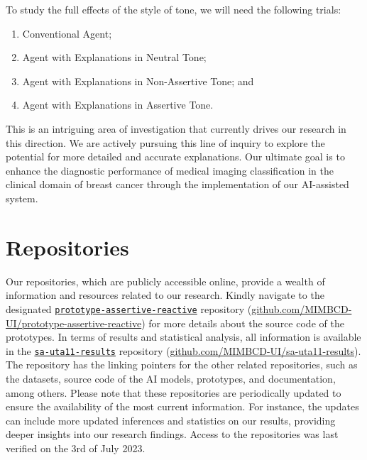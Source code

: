 \vspace{2.00mm}

\noindent
To study the full effects of the style of tone, we will need the following trials:

\vspace{0.05mm}

\begin{enumerate}
\item Conventional Agent;
\item Agent with Explanations in Neutral Tone;
\item Agent with Explanations in Non-Assertive Tone; and
\item Agent with Explanations in Assertive Tone.
\end{enumerate}

\vspace{0.50mm}

This is an intriguing area of investigation that currently drives our research in this direction.
We are actively pursuing this line of inquiry to explore the potential for more detailed and accurate explanations.
Our ultimate goal is to enhance the diagnostic performance of medical imaging classification in the clinical domain of breast cancer through the implementation of our \ac{AI}-assisted system.

\section{Repositories}
\label{sec:app005016}

Our repositories, which are publicly accessible online, provide a wealth of information and resources related to our research.
Kindly navigate to the designated \texttt{\href{https://github.com/MIMBCD-UI/prototype-assertive-reactive}{prototype-assertive-reactive}} repository (\href{https://github.com/MIMBCD-UI/prototype-assertive-reactive}{github.com/MIMBCD-UI/prototype-assertive-reactive}) for more details about the source code of the prototypes.
In terms of results and statistical analysis, all information is available in the \texttt{\href{https://github.com/MIMBCD-UI/sa-uta11-results}{sa-uta11-results}} repository (\href{https://github.com/MIMBCD-UI/sa-uta11-results}{github.com/MIMBCD-UI/sa-uta11-results}).
The repository has the linking pointers for the other related repositories, such as the datasets, source code of the \ac{AI} models, prototypes, and documentation, among others.
Please note that these repositories are periodically updated to ensure the availability of the most current information.
For instance, the updates can include more updated inferences and statistics on our results, providing deeper insights into our research findings.
Access to the repositories was last verified on the 3rd of July 2023.

